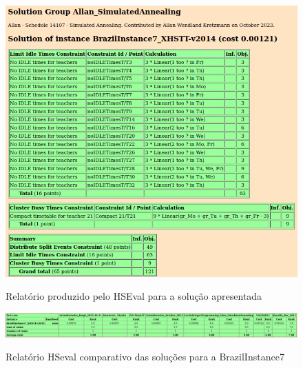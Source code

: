 \begin{figure}[h]
	\centering
	\caption{Relatório produzido pelo HSEval para a solução apresentada}
	\includegraphics[width=1\textwidth]{./dados/figuras/hseval_brazilinstance7}
	\label{fig:hseval_brazilinstance7}
\end{figure}

\begin{figure}[h]
	\centering
	\caption{Relatório HSeval comparativo das soluções para a BrazilInstance7}
	\includegraphics[width=1\textwidth]{./dados/figuras/benchmark_instance7}
	\label{fig:rankin_brazilinstance7}
\end{figure}